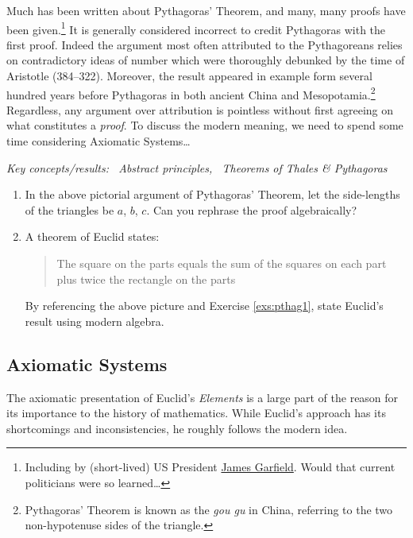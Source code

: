 Much has been written about Pythagoras' Theorem, and many, many proofs have been given.\footnote{%
	Including by (short-lived) US President \href{https://old.maa.org/press/periodicals/convergence/mathematical-treasure-james-a-garfields-proof-of-the-pythagorean-theorem}{James Garfield}. Would that current politicians were so learned\ldots%
}
It is generally considered incorrect to credit Pythagoras with the first proof. Indeed the argument most often attributed to the Pythagoreans relies on contradictory ideas of number which were thoroughly debunked by the time of Aristotle (384--322\BC). Moreover, the result appeared in example form several hundred years before Pythagoras in both ancient China and Mesopotamia.\footnote{%
	Pythagoras' Theorem is known as the \emph{gou gu} in China, referring to the two non-hypotenuse sides of the triangle.%
}
Regardless, any argument over attribution is pointless without first agreeing on what constitutes a \emph{proof}. To discuss the modern meaning, we need to spend some time considering Axiomatic Systems\ldots 


\begin{exercises}{}{}
	\emph{Key concepts/results: \ Abstract principles, \ Theorems of Thales \& Pythagoras}
	
	\begin{enumerate}
	  \item\label{exs:pthag1} In the above pictorial argument of Pythagoras' Theorem, let the side-lengths of the triangles be $a$, $b$, $c$. Can you rephrase the proof algebraically?
	  
		\item A theorem of Euclid states:
		\begin{quote}
			The square on the parts equals the sum of the squares on each part plus twice the rectangle on the parts
		\end{quote}
		By referencing the above picture and Exercise \ref{exs:pthag1}, state Euclid's result using modern algebra.
	\end{enumerate}
\end{exercises}



\clearpage


\subsection{Axiomatic Systems}

The axiomatic presentation of Euclid's \emph{Elements} is a large part of the reason for its importance to the history of mathematics. While Euclid's approach has its shortcomings and inconsistencies, he roughly follows the modern idea.

